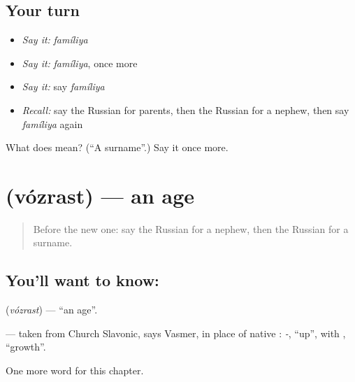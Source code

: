 \subsection*{Your turn}
\begin{itemize}
\raggedright
  \item \emph{Say it:} \emph{famíliya}
  \item \emph{Say it:} \emph{famíliya}, once more
  \item \emph{Say it:} say \emph{famíliya}
  \item \emph{Recall:} say the Russian for parents, then the Russian for a nephew, then say \emph{famíliya} again
\end{itemize}

\begin{tcolorbox}[breakable,colback=teal!4,colframe=teal!35!black,title={Before you move on}]
What does  mean? (\textquotedblleft{}A surname\textquotedblright{}.) Say it once more.
\end{tcolorbox}
\section[\texorpdfstring{\ru{возраст} (vózrast)}{возраст (vózrast)}]{ (vózrast) — an age}

\label{lesson:RU-C255-vozrast}



\begin{quote}
Before the new one: say the Russian for a nephew, then the Russian for a surname.
\end{quote}

\subsection*{You'll want to know: }
\textbf{} (\emph{vózrast}) — \textquotedblleft{}an age\textquotedblright{}.

\begin{cousinweb}
\textbf{} — taken from Church Slavonic, says Vasmer, in place of native \emph{}: \emph{-}, \textquotedblleft{}up\textquotedblright{}, with \emph{}, \textquotedblleft{}growth\textquotedblright{}.
\end{cousinweb}

\begin{grammarlens}[title={What you've built}]
One more word for this chapter.
\end{grammarlens}

